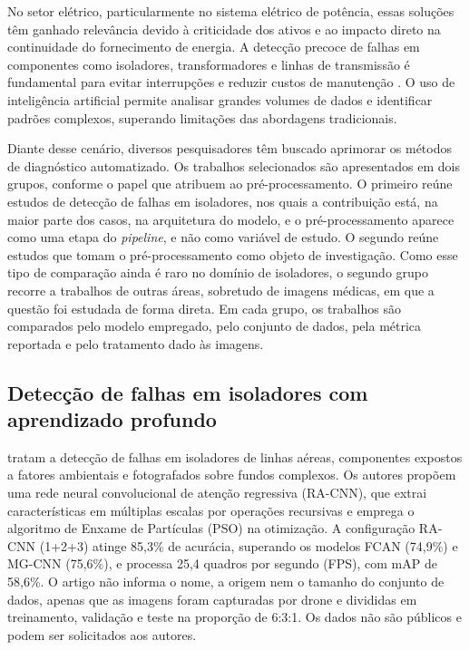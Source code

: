 No setor elétrico, particularmente no sistema elétrico de potência, essas soluções têm ganhado relevância devido à criticidade dos ativos e ao impacto direto na continuidade do fornecimento de energia. A detecção precoce de falhas em componentes como isoladores, transformadores e linhas de transmissão é fundamental para evitar interrupções e reduzir custos de manutenção \cite{wang2023}. O uso de inteligência artificial permite analisar grandes volumes de dados e identificar padrões complexos, superando limitações das abordagens tradicionais.

Diante desse cenário, diversos pesquisadores têm buscado aprimorar os métodos de diagnóstico automatizado. Os trabalhos selecionados são apresentados em dois grupos, conforme o papel que atribuem ao pré-processamento. O primeiro reúne estudos de detecção de falhas em isoladores, nos quais a contribuição está, na maior parte dos casos, na arquitetura do modelo, e o pré-processamento aparece como uma etapa do \textit{pipeline}, e não como variável de estudo. O segundo reúne estudos que tomam o pré-processamento como objeto de investigação. Como esse tipo de comparação ainda é raro no domínio de isoladores, o segundo grupo recorre a trabalhos de outras áreas, sobretudo de imagens médicas, em que a questão foi estudada de forma direta. Em cada grupo, os trabalhos são comparados pelo modelo empregado, pelo conjunto de dados, pela métrica reportada e pelo tratamento dado às imagens.

\subsection{Detecção de falhas em isoladores com aprendizado profundo}

 tratam a detecção de falhas em isoladores de linhas aéreas, componentes expostos a fatores ambientais e fotografados sobre fundos complexos. Os autores propõem uma rede neural convolucional de atenção regressiva (RA-CNN), que extrai características em múltiplas escalas por operações recursivas e emprega o algoritmo de Enxame de Partículas (PSO) na otimização. A configuração RA-CNN (1+2+3) atinge 85,3\% de acurácia, superando os modelos FCAN (74,9\%) e MG-CNN (75,6\%), e processa 25,4 quadros por segundo (FPS), com mAP de 58,6\%. O artigo não informa o nome, a origem nem o tamanho do conjunto de dados, apenas que as imagens foram capturadas por drone e divididas em treinamento, validação e teste na proporção de 6:3:1. Os dados não são públicos e podem ser solicitados aos autores.

